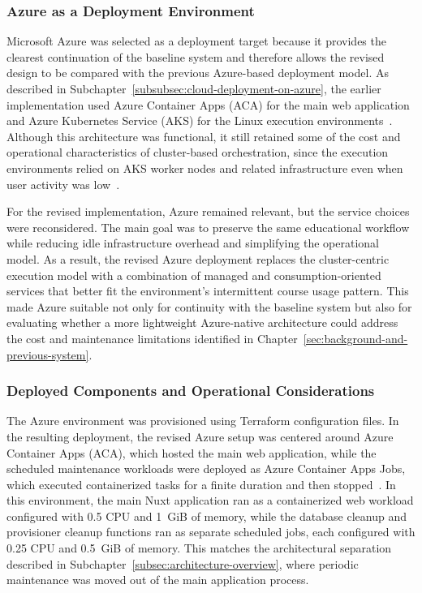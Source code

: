 \subsubsection{Azure as a Deployment Environment} \label{subsubsec:azure-as-a-deployment-environment}
Microsoft Azure was selected as a deployment target because it provides the clearest continuation of the baseline system and therefore allows the revised design to be compared with the previous Azure-based deployment model.
As described in Subchapter~\ref{subsubsec:cloud-deployment-on-azure}, the earlier implementation used Azure Container Apps (ACA) for the main web application and Azure Kubernetes Service (AKS) for the Linux execution environments~\cite{eistre_2024}.
Although this architecture was functional, it still retained some of the cost and operational characteristics of cluster-based orchestration, since the execution environments relied on AKS worker nodes and related infrastructure even when user activity was low~\cite{eistre_2024}.

For the revised implementation, Azure remained relevant, but the service choices were reconsidered.
The main goal was to preserve the same educational workflow while reducing idle infrastructure overhead and simplifying the operational model.
As a result, the revised Azure deployment replaces the cluster-centric execution model with a combination of managed and consumption-oriented services that better fit the environment's intermittent course usage pattern.
This made Azure suitable not only for continuity with the baseline system but also for evaluating whether a more lightweight Azure-native architecture could address the cost and maintenance limitations identified in Chapter~\ref{sec:background-and-previous-system}.

\subsubsection{Deployed Components and Operational Considerations} \label{subsubsec:deployed-components-and-operational-considerations-azure}
The Azure environment was provisioned using Terraform configuration files.
In the resulting deployment, the revised Azure setup was centered around Azure Container Apps (ACA), which hosted the main web application, while the scheduled maintenance workloads were deployed as Azure Container Apps Jobs, which executed containerized tasks for a finite duration and then stopped~\cite{microsoft_azure_container_apps_jobs_2026}.
In this environment, the main Nuxt application ran as a containerized web workload configured with 0.5 CPU and 1~GiB of memory, while the database cleanup and provisioner cleanup functions ran as separate scheduled jobs, each configured with 0.25 CPU and 0.5~GiB of memory.
This matches the architectural separation described in Subchapter~\ref{subsec:architecture-overview}, where periodic maintenance was moved out of the main application process.

